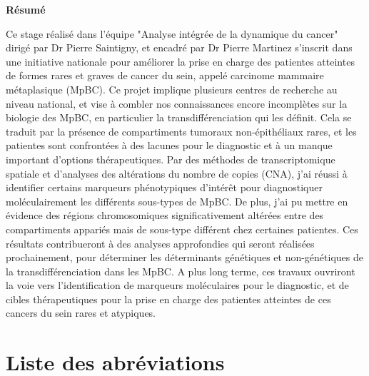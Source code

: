 \documentclass[11pt]{article}
\begin{document}
\onehalfspacing

\begin{titlepage}
    \centering
    \vspace*{4cm}
    {\LARGE\bfseries Résumé \par}
    \vspace{1cm}
    \noindent
    \begin{flushleft} %
        Ce stage réalisé dans l’équipe "Analyse intégrée de la dynamique du cancer" dirigé par Dr Pierre Saintigny, et encadré par Dr Pierre Martinez s’inscrit dans une initiative nationale pour améliorer la prise en charge des patientes atteintes de formes rares et graves de cancer du sein, appelé carcinome mammaire métaplasique (MpBC). Ce projet implique plusieurs centres de recherche au niveau national, et vise à combler nos connaissances encore incomplètes sur la biologie des MpBC, en particulier la transdifférenciation qui les définit. Cela se traduit par la présence de compartiments tumoraux non-épithéliaux rares, et les patientes sont confrontées à des lacunes pour le diagnostic et à un manque important d’options thérapeutiques. Par des méthodes de transcriptomique spatiale et d’analyses des altérations du nombre de copies (CNA), j’ai réussi à identifier certains marqueurs phénotypiques d’intérêt pour diagnostiquer moléculairement les différents sous-types de MpBC. De plus, j’ai pu mettre en évidence des régions chromosomiques significativement altérées entre des compartiments appariés mais de sous-type différent chez certaines patientes. Ces résultats contribueront à des analyses approfondies qui seront réalisées prochainement, pour déterminer les déterminants génétiques et non-génétiques de la transdifférenciation dans les MpBC. A plus long terme, ces travaux ouvriront la voie vers l’identification de marqueurs moléculaires pour le diagnostic, et de cibles thérapeutiques pour la prise en charge des patientes atteintes de ces cancers du sein rares et atypiques.
    \end{flushleft}
\end{titlepage}


\tableofcontents
\newpage

\listoffigures
\listoftables
\newpage

\section*{Liste des abréviations}
\end{document}
